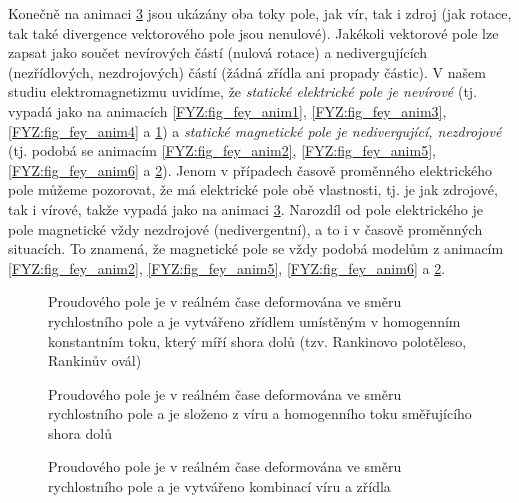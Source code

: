{    Konečně na animaci \ref{FYZ:fig_fey_anim9} jsou ukázány oba toky pole, jak vír, tak i zdroj 
    (jak rotace, tak také divergence vektorového pole jsou nenulové). Jakékoli vektorové pole lze 
    zapsat jako součet nevírových částí (nulová rotace) a nedivergujících (nezřídlových, 
    nezdrojových) částí (žádná zřídla ani propady částic). V našem studiu elektromagnetizmu 
    uvidíme, že\emph{ statické elektrické pole je nevírové} (tj. vypadá jako na animacích 
    \ref{FYZ:fig_fey_anim1}, \ref{FYZ:fig_fey_anim3}, \ref{FYZ:fig_fey_anim4} a 
    \ref{FYZ:fig_fey_anim7}) a \emph{statické magnetické pole je nedivergující, nezdrojové} (tj. 
    podobá se animacím \ref{FYZ:fig_fey_anim2}, \ref{FYZ:fig_fey_anim5}, \ref{FYZ:fig_fey_anim6} a 
    \ref{FYZ:fig_fey_anim8}). Jenom v případech časově proměnného elektrického pole můžeme 
    pozorovat, že má elektrické pole obě vlastnosti, tj. je jak zdrojové, tak i vírové, takže 
    vypadá jako na animaci \ref{FYZ:fig_fey_anim9}. Narozdíl od pole elektrického je pole 
    magnetické vždy nezdrojové (nedivergentní), a to i v časově proměnných situacích. To znamená, 
    že magnetické pole se vždy podobá modelům z animacím \ref{FYZ:fig_fey_anim2}, 
    \ref{FYZ:fig_fey_anim5}, \ref{FYZ:fig_fey_anim6} a \ref{FYZ:fig_fey_anim8}.              
    
    \begin{figure}[ht!]
      \centering
      \caption{Proudového pole je v reálném čase deformována ve směru  
               rychlostního pole a je vytvářeno zřídlem umístěným v 
               homogenním konstantním toku, který míří shora dolů 
               (tzv. Rankinovo polotěleso, Rankinův ovál)}
      \label{FYZ:fig_fey_anim7}
    \end{figure}

    \begin{figure}[ht!]
      \centering
      \caption{Proudového pole je v reálném čase deformována ve směru   
               rychlostního pole a je složeno z víru a homogenního toku 
               směřujícího shora dolů}
      \label{FYZ:fig_fey_anim8}
    \end{figure}

    \begin{figure}[ht!]
      \centering 
      \caption{Proudového pole je v reálném čase deformována ve směru    
               rychlostního pole a je vytvářeno kombinací víru a zřídla}
      \label{FYZ:fig_fey_anim9}
    \end{figure}
    \tikzexternalenable

} %
\printbibliography[title={Seznam literatury}, heading=subbibliography]
